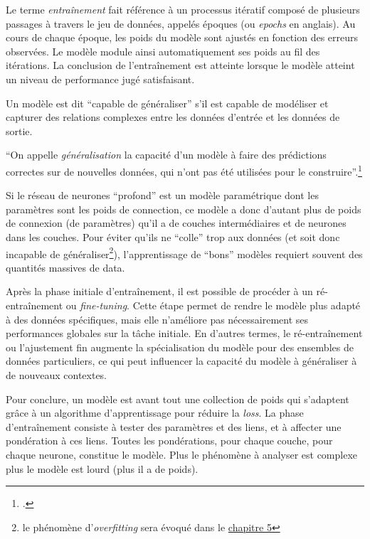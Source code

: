 Le terme \emph{entraînement} fait référence à un processus itératif
composé de plusieurs passages à travers le jeu de données, appelés
époques (ou \emph{epochs} en anglais). Au cours de chaque époque, les
poids du modèle sont ajustés en fonction des erreurs observées. Le
modèle module ainsi automatiquement ses poids au fil des itérations. La
conclusion de l'entraînement est atteinte lorsque le modèle atteint un
niveau de performance jugé satisfaisant.

Un modèle est dit ``capable de généraliser'' s'il est capable de
modéliser et capturer des relations complexes entre les données d'entrée
et les données de sortie.

\begin{kwote}                     
``On appelle \emph{généralisation} la capacité d'un modèle à faire des
prédictions correctes sur de nouvelles données, qui n'ont pas été
utilisées pour le construire''.\footcite[p.27]{azencott_introduction_2022}
                 \end{kwote}     

Si le réseau de neurones ``profond'' est un modèle paramétrique dont les
paramètres sont les poids de connection, ce modèle a donc d'autant plus
de poids de connexion (de paramètres) qu'il a de couches intermédiaires
et de neurones dans les couches. Pour éviter qu'ils ne ``colle'' trop
aux données (et soit donc incapable de généraliser\footnote{le phénomène
  d'\emph{overfitting} sera évoqué dans le \hyperlink{fine-tuner-le-modele}{chapitre 5}}),
l'apprentissage de ``bons'' modèles requiert souvent des quantités
massives de data.

Après la phase initiale d'entraînement, il est possible de procéder à un
ré-entraînement ou \emph{fine-tuning}. Cette étape permet de rendre le
modèle plus adapté à des données spécifiques, mais elle n'améliore pas
nécessairement ses performances globales sur la tâche initiale. En
d'autres termes, le ré-entraînement ou l'ajustement fin augmente la
spécialisation du modèle pour des ensembles de données particuliers, ce
qui peut influencer la capacité du modèle à généraliser à de nouveaux
contextes.

Pour conclure, un modèle est avant tout une collection de poids qui
s'adaptent grâce à un algorithme d'apprentissage pour réduire la \textit{loss}.
La phase d'entraînement consiste à tester des paramètres et des liens,
et à affecter une pondération à ces liens. Toutes les pondérations,
pour chaque couche, pour chaque neurone, constitue le modèle. Plus le
phénomène à analyser est complexe plus le modèle est lourd (plus il a de
poids).